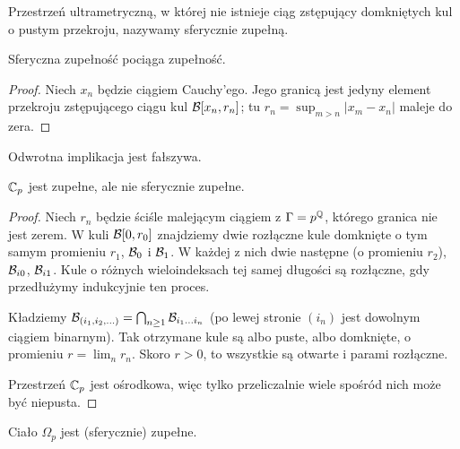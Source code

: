 \begin{definicja}
	Przestrzeń ultrametryczną, w której nie istnieje ciąg zstępujący domkniętych kul o pustym przekroju, nazywamy sferycznie zupełną.
\end{definicja}

\begin{fakt}
	Sferyczna zupełność pociąga zupełność.
\end{fakt}

\begin{proof}
	Niech $x_n$ będzie ciągiem Cauchy'ego.
	Jego granicą jest jedyny element przekroju zstępującego ciągu kul $\mathcal B[x_n, r_n]$; tu $r_n = \sup_{m > n} |x_m -x_n|$ maleje do zera.
\end{proof}

Odwrotna implikacja jest fałszywa.

\begin{przyklad}
	$\mathbb C_p$ jest zupełne, ale nie sferycznie zupełne.
\end{przyklad}

\begin{proof}
	Niech $r_n$ będzie ściśle malejącym ciągiem z $\Gamma = p^\mathbb Q$, którego granica nie jest zerem.
	W kuli $\mathcal B[0, r_0]$ znajdziemy dwie rozłączne kule domknięte o tym samym promieniu $r_1$, $\mathcal B_0$ i $\mathcal B_1$.
	W każdej z nich dwie następne (o promieniu $r_2$), $\mathcal B_{i0}$, $\mathcal B_{i1}$.
	Kule o różnych wieloindeksach tej samej długości są rozłączne, gdy przedłużymy indukcyjnie ten proces.

	Kładziemy $\mathcal B_{(i_1, i_2, \ldots)} = \bigcap_{n \ge 1} \mathcal B_{i_1\ldots i_n}$ (po lewej stronie $(i_n)$ jest dowolnym ciągiem binarnym).
	Tak otrzymane kule są albo puste, albo domknięte, o promieniu $r = \lim_n r_n$.
	Skoro $r > 0$, to wszystkie są otwarte i parami rozłączne.

	Przestrzeń $\mathbb C_p$ jest ośrodkowa, więc tylko przeliczalnie wiele spośród nich może być niepusta.
\end{proof}

\begin{fakt}
	Ciało $\Omega_p$ jest (sferycznie) zupełne.
\end{fakt}

